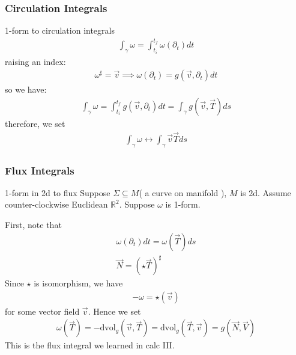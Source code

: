 \documentclass[10pt]{amsart}
\newcommand{\p}{\partial}
\newcommand{\dvol}{\text{dvol}_g}
\newcommand{\R}{\mathbb{R}}
\renewcommand{\*}{\star}
\begin{document}
\subsubsection{Circulation Integrals}%
\label{ssub:circulation_integrals}

1-form to circulation integrals
\begin{align*}
  \int_\gamma\omega=\int_{t_i}^{t_f}\omega(\p_t)dt
\end{align*}
raising an index:
\begin{align*}
  \omega^\sharp=\vec{v}\implies\omega(\p_t)=g(\vec{v},\p_t)dt
\end{align*}
so we have:
\begin{align*}
  \int_\gamma\omega=\int_{t_i}^{t_f}g(\vec{v},\p_t)dt=\int_\gamma
  g(\vec{v},\vec{T})ds
\end{align*}
therefore, we set
\begin{align*}
  \int_\gamma \omega\leftrightarrow\int_\gamma\vec{v}\vec{T}ds
\end{align*}

\subsubsection{Flux Integrals}%
\label{ssub:flux_integrals}

1-form in 2d to flux
Suppose $\Sigma\subseteq M$( a curve on manifold ), $M$ is 2d. Assume
counter-clockwise Euclidean $\R^2$. Suppose $\omega$ is 1-form.

First, note that
\begin{align*}
  \omega(\p_t)dt=\omega(\vec{T})ds\\
  \vec{N}=(\*\vec{T})^\sharp
\end{align*}
Since $\*$ is isomorphism, we have
\begin{align*}
  -\omega=\*(\vec{v})
\end{align*}
for some vector field $\vec{v}$. Hence we set
\begin{align*}
  \omega(\vec{T})=-\dvol(\vec{v},\vec{T})=\dvol(\vec{T},\vec{v})=g(\vec{N},\vec{V})
\end{align*}
This is the flux integral we learned in calc III.
\end{document}
